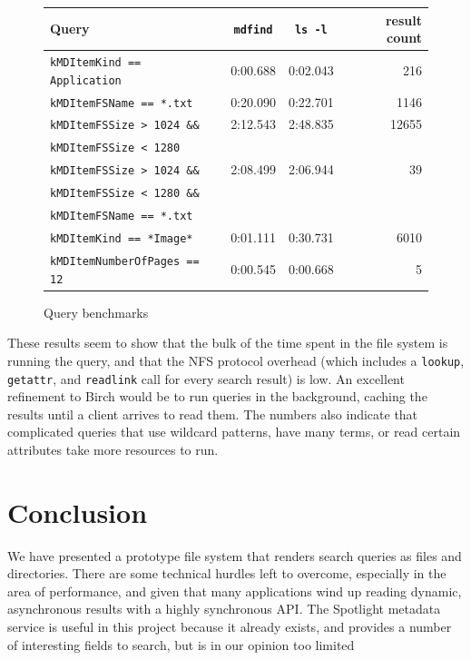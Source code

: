 \documentclass{article}
\begin{document}
\begin{figure}[ht!]
\begin{center}
\begin{tabular}{|l|c|c|r|} \hline
 \textbf{Query} & \texttt{mdfind}   & \texttt{ls -l} & \textbf{result count} \\ \hline \hline
\texttt{kMDItemKind == Application} & 0:00.688 & 0:02.043 &   216 \\ \hline
\texttt{kMDItemFSName == *.txt}     & 0:20.090 & 0:22.701 &  1146 \\ \hline
\texttt{kMDItemFSSize > 1024 \&\&}  & 2:12.543 & 2:48.835 & 12655 \\
\texttt{kMDItemFSSize < 1280}       &          &          &       \\ \hline
\texttt{kMDItemFSSize > 1024 \&\&}  & 2:08.499 & 2:06.944 &    39 \\
\texttt{kMDItemFSSize < 1280 \&\&}  &          &          &       \\ 
\texttt{kMDItemFSName == *.txt}     &          &          &       \\ \hline
\texttt{kMDItemKind == *Image*}     & 0:01.111 & 0:30.731 &  6010 \\ \hline
\texttt{kMDItemNumberOfPages == 12} & 0:00.545 & 0:00.668 &     5 \\ \hline
\end{tabular}
\caption{Query benchmarks}
\label{fig:benchmarks}
\end{center}
\end{figure}

These results seem to show that the bulk of the time spent in the file
system is running the query, and that the NFS protocol overhead (which
includes a \texttt{lookup}, \texttt{getattr}, and \texttt{readlink}
call for every search result) is low. An excellent refinement to Birch
would be to run queries in the background, caching the results until a
client arrives to read them. The numbers also indicate that
complicated queries that use wildcard patterns, have many terms, or
read certain attributes take more resources to run. 

\section{Conclusion}

We have presented a prototype file system that renders search queries
as files and directories. There are some technical hurdles left to
overcome, especially in the area of performance, and given that many
applications wind up reading dynamic, asynchronous results with a
highly synchronous API. The Spotlight metadata service is useful in
this project because it already exists, and provides a number of
interesting fields to search, but is in our opinion too limited 
\end{document}
